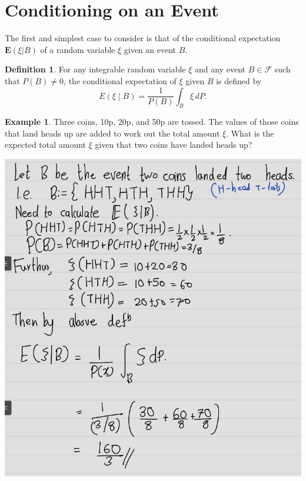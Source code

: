 \documentclass[
]{book}
\theoremstyle{definition}
\newtheorem{definition}{Definition}[chapter]
\theoremstyle{definition}
\newtheorem{example}{Example}[chapter]
\theoremstyle{definition}
\theoremstyle{definition}
\theoremstyle{remark}
\begin{document}
\section{Conditioning on an Event}\label{conditioning-on-an-event}

The first and simplest case to consider is that of the conditional expectation
\(\mathbf{E} (\xi|B)\) of a random variable \(\xi\) given an event \(B\).

\begin{definition}
\protect\hypertarget{def:unnamed-chunk-42}{}\label{def:unnamed-chunk-42}For any integrable random variable \(\xi\) and any event \(B \in \mathcal{F}\) such that \(P(B) \neq 0\), the conditional expectation of \(\xi\) given \(B\) is defined by
\[
E(\xi \mid B) = \frac{1}{P(B)} \int_B \xi \, dP.
\]
\end{definition}

\begin{example}
\protect\hypertarget{exm:unnamed-chunk-43}{}\label{exm:unnamed-chunk-43}Three coins, 10p, 20p, and 50p are tossed. The values of those coins that land heads up are added to work out the total amount \(\xi\). What is the expected total amount \(\xi\) given that two coins have landed heads up?
\end{example}

\includegraphics[width=18cm,height=\textheight]{fig/fig eg2.1.png}
\end{document}
